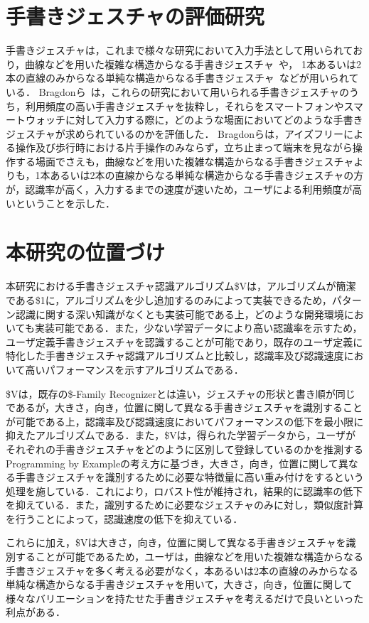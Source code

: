 \section{手書きジェスチャの評価研究}
手書きジェスチャは，これまで様々な研究において入力手法として用いられており，曲線などを用いた複雑な構造からなる手書きジェスチャ~\cite{Lu:2011:GAT:1978942.1978972,Li:2010:GST:1866029.1866044,Moran:1997:PIT:263407.263508,Hinckley:2007:ISS:1240624.1240666,Appert:2009:USC:1518701.1519052,Liao:2008:PGC:1314683.1314686,Zeleznik:2008:LCD:1449715.1449741}や，
1本あるいは2本の直線のみからなる単純な構造からなる手書きジェスチャ~\cite{Kurtenbach:1993:LEP:164632.164977}などが用いられている．
Bragdonら~\cite{Bragdon:2011:EAT:1978942.1979000}は，これらの研究において用いられる手書きジェスチャのうち，利用頻度の高い手書きジェスチャを抜粋し，それらをスマートフォンやスマートウォッチに対して入力する際に，どのような場面においてどのような手書きジェスチャが求められているのかを評価した．
Bragdonらは，アイズフリーによる操作及び歩行時における片手操作のみならず，立ち止まって端末を見ながら操作する場面でさえも，曲線などを用いた複雑な構造からなる手書きジェスチャよりも，1本あるいは2本の直線からなる単純な構造からなる手書きジェスチャの方が，認識率が高く，入力するまでの速度が速いため，ユーザによる利用頻度が高いということを示した．

\section{本研究の位置づけ}
本研究における手書きジェスチャ認識アルゴリズム\$Vは，アルゴリズムが簡潔である\$1に，アルゴリズムを少し追加するのみによって実装できるため，パターン認識に関する深い知識がなくとも実装可能である上，どのような開発環境においても実装可能である．また，少ない学習データにより高い認識率を示すため，ユーザ定義手書きジェスチャを認識することが可能であり，既存のユーザ定義に特化した手書きジェスチャ認識アルゴリズムと比較し，認識率及び認識速度において高いパフォーマンスを示すアルゴリズムである．

\$Vは，既存の\$-Family Recognizerとは違い，ジェスチャの形状と書き順が同じであるが，大きさ，向き，位置に関して異なる手書きジェスチャを識別することが可能である上，認識率及び認識速度においてパフォーマンスの低下を最小限に抑えたアルゴリズムである．また，\$Vは，得られた学習データから，ユーザがそれぞれの手書きジェスチャをどのように区別して登録しているのかを推測するProgramming by Exampleの考え方に基づき，大きさ，向き，位置に関して異なる手書きジェスチャを識別するために必要な特徴量に高い重み付けをするという処理を施している．これにより，ロバスト性が維持され，結果的に認識率の低下を抑えている．また，識別するために必要なジェスチャのみに対し，類似度計算を行うことによって，認識速度の低下を抑えている．

これらに加え，\$Vは大きさ，向き，位置に関して異なる手書きジェスチャを識別することが可能であるため，ユーザは，曲線などを用いた複雑な構造からなる手書きジェスチャを多く考える必要がなく，本あるいは2本の直線のみからなる単純な構造からなる手書きジェスチャを用いて，大きさ，向き，位置に関して様々なバリエーションを持たせた手書きジェスチャを考えるだけで良いといった利点がある．





